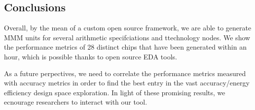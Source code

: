 \subsection{Conclusions}
\label{sec:conclusions}
Overall, by the mean of a custom open source framework, we are able to generate MMM units for several arithmetic specifciations and ttechnology nodes.
We show the performance metrics of 28 distinct chips that have been generated within an hour, which is possible thanks to open source EDA tools.

As a future perpectives, we need to correlate the performance metrics measured with accuracy metrics in order to find the best entry in the vast accuracy/energy efficiency design space exploration.
In light of these promising results, we ecnourage researchers to interact with our tool.
